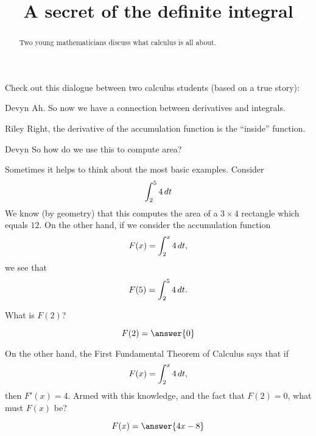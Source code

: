 \documentclass{ximera}
\title[Break-Ground:]{A secret of the definite integral}
\begin{document}
\begin{abstract}
Two young mathematicians discuss what calculus is all about.
\end{abstract}
\maketitle


Check out this dialogue between two calculus students (based on a true
story):

\begin{dialogue}
\item[Devyn] Ah. So now we have a connection between derivatives and
  integrals.
\item[Riley] Right, the derivative of the accumulation function is the
  ``inside'' function.
\item[Devyn] So how do we use this to compute area?
\end{dialogue}

Sometimes it helps to think about the most basic examples. Consider
\[
\int_2^5 4 \mathop{}\!d t
\]
We know (by geometry) that this computes the area of a $3\times 4$
rectangle which equals $12$. On the other hand, if we consider the
accumulation function
\[
F(x) = \int_2^x 4 \mathop{}\!d t,
\]
we see that
\[
F(5) = \int_2^5 4 \mathop{}\!d t.
\]
\begin{problem}
  What is $F(2)$?
  \begin{prompt}
    \[
    F(2) = \answer{0}
    \]
  \end{prompt}
\end{problem}

\begin{problem}
  On the other hand, the First Fundamental Theorem of Calculus says that if
  \[
  F(x) = \int_2^x 4 \mathop{}\!d t,
  \]
  then $F'(x) = 4$. Armed with this knowledge, and the fact that $F(2)
  = 0$, what must $F(x)$ be?
  \begin{prompt}
    \[
    F(x) = \answer{4x-8}
    \]
  \end{prompt}
\end{problem}






\end{document}

